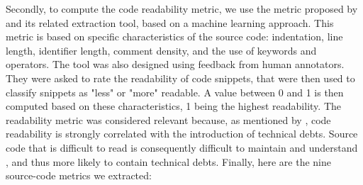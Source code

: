 
Secondly, to compute the code readability metric, we use the metric proposed by \citet{Buse:tse2010} and its related extraction tool, based on a machine learning approach. This metric is based on specific characteristics of the source code: indentation, line length, identifier length, comment density, and the use of keywords and operators. The tool was also designed using feedback from human annotators. They were asked to rate the readability of code snippets, that were then used to classify snippets as "less" or "more" readable. A value between 0 and 1 is then computed based on these characteristics, 1 being the highest readability. The readability metric was considered relevant because, as mentioned by \citet{BavotaR16}, code readability is strongly correlated with the introduction of technical debts. Source code that is difficult to read is consequently difficult to maintain and understand \citep{Buse:tse2010}, and thus more likely to contain technical debts. Finally, here are the nine source-code metrics we extracted: \par

